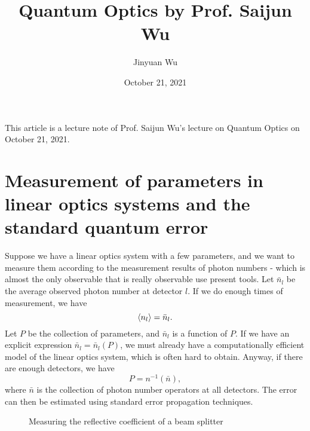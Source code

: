 \documentclass[hyperref, a4paper]{article}
\title{Quantum Optics by Prof. Saijun Wu}
\author{Jinyuan Wu}
\date{October 21, 2021}
\begin{document}
\maketitle

This article is a lecture note of Prof. Saijun Wu's lecture on Quantum Optics on October 21, 2021.

\section{Measurement of parameters in linear optics systems and the standard quantum error}

Suppose we have a linear optics system with a few parameters, 
and we want to measure them according to the measurement results of photon numbers
- which is almost the only observable that is really observable use present tools.
Let $\bar{n}_l$ be the average observed photon number at detector $l$. 
If we do enough times of measurement, we have 
\begin{equation}
    \expval{n_l} = \bar{n}_l.
\end{equation}
Let $P$ be the collection of parameters, and $\bar{n}_l$ is a function of $P$.
If we have an explicit expression $\bar{n}_l = \bar{n}_l(P)$, we must already have a computationally efficient model of the linear optics system, which is often hard to obtain.
Anyway, if there are enough detectors, we have 
\begin{equation}
    P = n^{-1}(\bar{n}),
\end{equation}
where $\bar{n}$ is the collection of photon number operators at all detectors.
The error can then be estimated using standard error propagation techniques.

\begin{figure}
    \centering
    
    \caption{Measuring the reflective coefficient of a beam splitter}
    \label{fig:measure-mean-splitter}
\end{figure}
\end{document}
